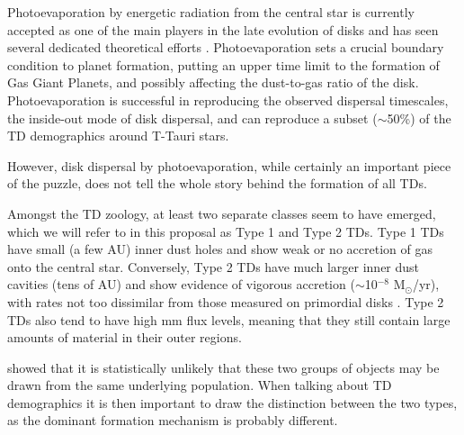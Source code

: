 \documentclass[10pt,fleqn,twoside]{article}
\begin{document}
Photoevaporation by energetic radiation from the central star is currently accepted as one of
the main players in the late evolution of disks and has seen several
dedicated theoretical efforts 
\citep[e.g.,][]{2001MNRAS.328..485C, 2006MNRAS.369..216A, 2008ApJ...688..398E,
2009ApJ...699.1639E, 2010MNRAS.401.1415O, 2011MNRAS.412...13O, 2012MNRAS.422.1880O,
2009ApJ...690.1539G, 2009ApJ...705.1237G, 2015ApJ...804...29G}.
Photoevaporation sets a crucial boundary condition to planet formation, 
putting an upper time limit to the formation of Gas Giant Planets, and 
possibly affecting the dust-to-gas ratio of the disk.
Photoevaporation is
successful in reproducing the observed dispersal timescales, the
inside-out mode of disk dispersal, and can reproduce a subset
($\sim$50\%) of the TD demographics around T-Tauri stars.

However, disk dispersal by photoevaporation, while certainly an important piece of the
puzzle, does not tell the whole story behind the formation of all
TDs. 

\begin{highlight}
Amongst the TD zoology, at least two separate classes seem
to have emerged, which we will refer to in this proposal as Type 1 and
Type 2 TDs. Type 1 TDs have small (a few AU) inner dust holes and show weak or no accretion of
gas onto the central star. Conversely, Type
2 TDs have much larger inner dust cavities (tens of AU) and show evidence of vigorous accretion ($\sim$10$^{-8}$
M$_{\odot}$/yr), with rates not too dissimilar from those measured
on primordial disks \citep[e.g.,][]{2014A&A...568A..18M}.
Type 2 TDs also tend to have high mm flux levels, meaning that
they still contain large amounts of material in their outer
regions. 
\end{highlight}
\citet{2012MNRAS.426L..96O} showed that it is statistically
unlikely that these two groups of objects may be drawn from the same
underlying population. When talking about TD demographics it is then
important to draw the distinction between the two types, as the
dominant formation mechanism is probably different. 
\end{document}

